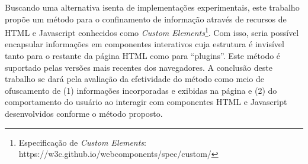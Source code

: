 Buscando uma alternativa isenta de implementações experimentais, este trabalho propõe um método para o confinamento de informação através de recursos de HTML e Javascript conhecidos como \textit{Custom Elements}\footnote{Especificação de \textit{Custom Elements}: https://w3c.github.io/webcomponents/spec/custom/}. Com isso, seria possível encapsular informações em componentes interativos cuja estrutura é invisível tanto para o restante da página HTML como para ``plugins''. Este método é suportado pelas versões mais recentes dos navegadores. A conclusão deste trabalho se dará pela avaliação da efetividade do método como meio de ofuscamento de (1) informações incorporadas e exibidas na página e (2) do comportamento do usuário ao interagir com componentes HTML e Javascript desenvolvidos conforme o método proposto.
